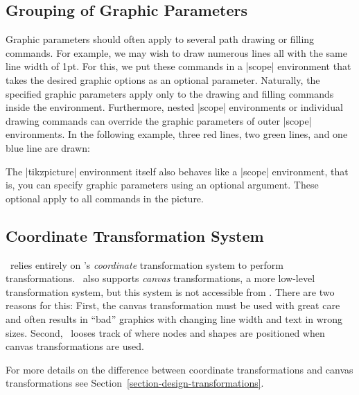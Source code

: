 \subsection{Grouping of Graphic Parameters}

Graphic parameters should often apply to several path drawing or
filling commands. For example, we may wish to draw numerous lines all
with the same line width of 1pt. For this, we put these commands
in a |{scope}| environment that takes the desired graphic options
as an optional parameter. Naturally, the specified graphic
parameters apply only to the drawing and filling commands inside the
environment. Furthermore, nested |{scope}| environments or
individual drawing commands can override the graphic parameters of
outer |{scope}| environments. In the following example, three red
lines, two green lines, and one blue line are drawn:

\begin{codeexample}[]
\begin{tikzpicture}
  \begin{scope}[color=red]
    \draw (0mm,10mm) -- (10mm,10mm);
    \draw (0mm, 8mm) -- (10mm, 8mm);
    \draw (0mm, 6mm) -- (10mm, 6mm);
  \end{scope}
  \begin{scope}[color=green]
    \draw             (0mm, 4mm) -- (10mm, 4mm);
    \draw             (0mm, 2mm) -- (10mm, 2mm);
    \draw[color=blue] (0mm, 0mm) -- (10mm, 0mm);
  \end{scope}
\end{tikzpicture}
\end{codeexample}

The |{tikzpicture}| environment itself also behaves like a
|{scope}| environment, that is, you can specify graphic parameters
using an optional argument. These optional apply to all commands in
the picture.


\subsection{Coordinate Transformation System}

\tikzname\ relies entirely on \pgfname's \emph{coordinate} transformation
system to perform transformations. \pgfname\ also supports
\emph{canvas} transformations, a more low-level transformation system,
but this system is not accessible from \tikzname. There are two reasons
for this: First, the canvas transformation must be used with great
care and often results in ``bad'' graphics with changing line width
and text in wrong sizes. Second, \pgfname\ looses track of where nodes
and shapes are positioned when canvas transformations are used.

For more details on the difference between coordinate transformations
and canvas transformations see
Section~\ref{section-design-transformations}. 
